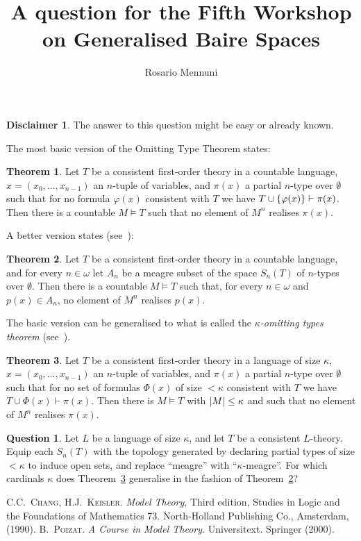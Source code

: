 \documentclass[a4paper, 11pt]{article}
\title{A question for the Fifth Workshop on Generalised Baire Spaces}
\author{Rosario Mennuni}
\date{}
\renewcommand{\phi}{\varphi}
\DeclarePairedDelimiter{\set}{\{}{\}}
\DeclarePairedDelimiter{\abs}{\lvert}{\rvert}
\theoremstyle{definition}
\newtheorem{thm}{Theorem}
\newtheorem*{question}{Question}
\newtheorem*{disclaimer}{Disclaimer}
\begin{document}
  \maketitle
\begin{disclaimer}
The answer to this question might be easy or already known.
\end{disclaimer}


The most basic version of the Omitting Type Theorem states:
\begin{thm}
  Let $T$ be a  consistent first-order theory in a countable language, $x=(x_0,\ldots,x_{n-1})$ an $n$-tuple of variables, and $\pi(x)$ a partial $n$-type over $\emptyset$ such that for no formula $\phi(x)$ consistent with $T$ we have $T\cup \set{\phi(x)}\vdash \pi(x)$. Then there is a countable  $M\models T$ such that no element of $M^n$ realises $\pi(x)$.
\end{thm}
A better version states (see~\cite[Theorem~10.3]{poizat}):
\begin{thm}\label{thm:ott_meagre}
  Let $T$ be a consistent first-order theory in a countable language, and for every $n\in \omega$ let $A_n$ be a meagre subset of the space $S_n(T)$ of $n$-types over $\emptyset$. Then there is a countable $M\models T$ such that, for every $n\in \omega$ and $p(x)\in A_n$, no element of $M^n$ realises $p(x)$.
\end{thm}
The basic version can be generalised to what is called the \emph{$\kappa$-omitting types theorem} (see~\cite[Theorem~2.2.19]{changkeisler}).
\begin{thm}\label{thm:kappaott}
  Let $T$ be a consistent first-order theory in a language of size $\kappa$, $x=(x_0,\ldots, x_{n-1})$ an $n$-tuple of variables, and $\pi(x)$ a  partial $n$-type over $\emptyset$ such that for no set of formulas $\Phi(x)$ of size $<\kappa$  consistent with $T$ we have $T\cup \Phi(x)\vdash \pi(x)$. Then there is $M\models T$ with $\abs M\le \kappa$ and such that no element of $M^n$ realises $\pi(x)$.
\end{thm}


\begin{question}
Let $L$ be a language of size $\kappa$, and let $T$ be a consistent $L$-theory.  Equip each $S_n(T)$ with the topology  generated by declaring partial types of size $<\kappa$ to induce open sets, and  replace ``meagre'' with ``$\kappa$-meagre''. For which cardinals $\kappa$ does Theorem~\ref{thm:kappaott} generalise in the fashion of Theorem~\ref{thm:ott_meagre}?
\end{question}
\begin{thebibliography}{0}
C.C.~\textsc{Chang}, H.J.~\textsc{Keisler}.
\newblock \emph{Model Theory},
\newblock Third edition, Studies in Logic and the Foundations of Mathematics 73. North-Holland Publishing Co., Amsterdam, (1990). 
B.~\textsc{Poizat}.
\newblock \emph{A Course in Model Theory}.
\newblock Universitext. Springer (2000).
\end{thebibliography}
\end{document}
